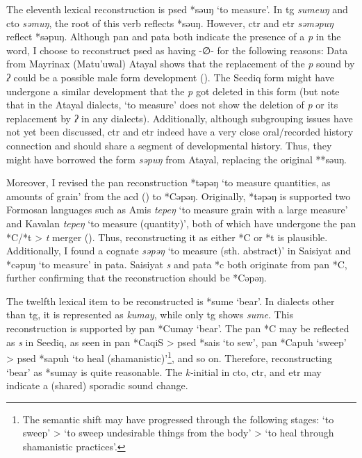 The eleventh lexical reconstruction is \acl{psed} *səuŋ `to measure'. In \acl{tg} \textit{sumeuŋ} and \acl{cto} \textit{səmuŋ}, the root of this verb reflects *səuŋ. However, \acl{ctr} and \acl{etr} \textit{səməpuŋ} reflect *səpuŋ. Although \acl{pan} and \acl{pata} both indicate the presence of a \textit{p} in the word, I choose to reconstruct \acl{psed} as having -∅- for the following reasons: Data from Mayrinax (Matu'uwal) Atayal shows that the replacement of the \textit{p} sound by \textit{ʔ} could be a possible male form development (\cite[12]{li1983gender}). The Seediq form might have undergone a similar development that the \textit{p} got deleted in this form (but note that in the Atayal dialects, `to measure' does not show the deletion of \textit{p} or its replacement by \textit{ʔ} in any dialects). Additionally, although subgrouping issues have not yet been discussed, \acl{ctr} and \acl{etr} indeed have a very close oral/recorded history connection and should share a segment of developmental history. Thus, they might have borrowed the form \textit{səpuŋ} from Atayal, replacing the original **səuŋ.

Moreover, I revised the \acs{pan} reconstruction *təpəŋ `to measure quantities, as amounts of grain' from the \ac{acd} (\cite{ACD}) to *Cəpəŋ. Originally, *təpəŋ is supported two Formosan languages such as Amis \textit{tepeŋ} `to measure grain with a large measure' and Kavalan \textit{tepeŋ} `to measure (quantity)', both of which have undergone the \acs{pan} *C/*t > \textit{t} merger (\cite[44]{blust1999subgrouping}). Thus, reconstructing it as either *C or *t is plausible. Additionally, I found a cognate \textit{səpəŋ} `to measure (sth. abstract)' in Saisiyat and *cəpuŋ `to measure' in \acl{pata}. Saisiyat \textit{s} and \acl{pata} *c both originate from \acs{pan} *C, further confirming that the reconstruction should be *Cəpəŋ.


The twelfth lexical item to be reconstructed is *sume `bear'. In dialects other than \acl{tg}, it is represented as \textit{kumay}, while only \acl{tg} shows \textit{sume}. This reconstruction is supported by \acs{pan} *Cumay `bear'. The \acs{pan} *C may be reflected as \textit{s} in Seediq, as seen in \acs{pan} *CaqiS > \acs{psed} *sais `to sew', \acs{pan} *Capuh `sweep' > \acs{psed} *sapuh `to heal (shamanistic)'\footnote{The semantic shift may have progressed through the following stages: `to sweep' > `to sweep undesirable things from the body' > `to heal through shamanistic practices'.}, and so on. Therefore, reconstructing `bear' as *sumay is quite reasonable. The \textit{k-}initial in \acl{cto}, \acl{ctr}, and \acl{etr} may indicate a (shared) sporadic sound change.

